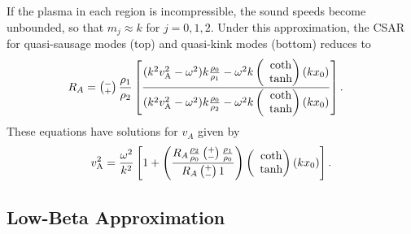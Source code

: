 \documentclass[namedreferences]{solarphysics}
\numberwithin{equation}{section}
\begin{document}
\begin{article}
If the plasma in each region is incompressible, the sound speeds become unbounded, so that $m_j \approx k$ for $j = 0,1,2$. Under this approximation, the CSAR for quasi-sausage modes (top) and quasi-kink modes (bottom) reduces to
\begin{align}
R_A &= \left(\substack{- \\ +}\right) \frac{\rho_1}{\rho_2} \left[ \frac{(k^2v_\textrm{A}^2-\omega^2)k\frac{\rho_0}{\rho_1}-\omega^2k \left(\hspace{-0.07in}\begin{matrix} &\coth \\ &\tanh \end{matrix}\right)(kx_0)}{(k^2v_\textrm{A}^2-\omega^2)k\frac{\rho_0}{\rho_2}-\omega^2k \left(\hspace{-0.07in}\begin{matrix} &\coth \\ &\tanh \end{matrix}\right)(kx_0)} \right].
\end{align}
These equations have solutions for $v_A$ given by
\begin{equation}
v_\textrm{A}^2 = \frac{\omega^2}{k^2} \left[ 1 + \left( \frac{R_A \frac{\rho_2}{\rho_0} \left(\substack{+ \\ -}\right) \frac{\rho_1}{\rho_0}}{R_A \left(\substack{+ \\ -}\right) 1} \right) \left(\hspace{-0.07in}\begin{matrix} &\coth \\ &\tanh \end{matrix}\right) (kx_0)\right].
\end{equation}

\subsection{Low-Beta Approximation} \label{sec: CSAR low-beta}


\end{article}
\end{document}
